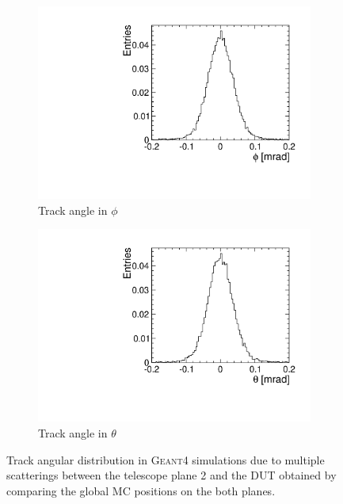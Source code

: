\begin{figure}[htbp] \centering
  \begin{subfigure}[b]{0.45\textwidth}
    \includegraphics[width=\textwidth]{./figures/Telescope/MC_trackAnglePhi_planes_302_50.pdf}
    \caption{Track angle in $\phi$}
  \end{subfigure}\hfill
  \begin{subfigure}[b]{0.45\textwidth}
    \includegraphics[width=\textwidth]{./figures/Telescope/MC_trackAngleTheta_planes_302_50.pdf}
    \caption{Track angle in $\theta$}
  \end{subfigure}
  \caption{Track angular distribution in \textsc{Geant4} simulations
    due to multiple scatterings between the telescope plane 2 and the
    DUT obtained by comparing the global MC positions on the both
    planes.}
  \label{fig:MCbeamAngleDistr}
\end{figure}

